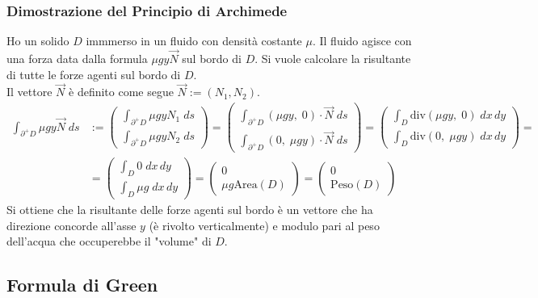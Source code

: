 \documentclass[a4paper]{article}
\newcommand\diver{\text{div}} %
\begin{document}
\subsubsection*{Dimostrazione del Principio di Archimede}
Ho un solido \(D\) immmerso in un fluido con densità costante \(\mu\). Il fluido agisce con una forza data dalla formula
\(\mu g y \vec{N}\) sul bordo di \(D\). Si vuole calcolare la risultante di tutte le forze agenti sul bordo di \(D\). \\
Il vettore \(\vec{N}\) è definito come segue \(\vec{N} := (N_1, N_2)\).
\begin{align*}
	\int_{\partial^+D} \mu g y \vec{N} \; ds &:= \left(\begin{matrix}
		\displaystyle \int_{\partial^+D} \mu g y N_1 \; ds \\[10pt]
		\displaystyle \int_{\partial^+D} \mu g y N_2 \; ds
	\end{matrix}\right) = \left(\begin{matrix}
		\displaystyle \int_{\partial^+D} (\mu g y, \; 0) \cdot \vec{N} \; ds \\[10pt]
		\displaystyle \int_{\partial^+D} (0, \; \mu g y) \cdot \vec{N} \; ds
	\end{matrix}\right) = \left(\begin{matrix}
		\displaystyle \int_D \diver (\mu g y, \; 0) \; dx \, dy \\[10pt]
		\displaystyle \int_D \diver (0, \; \mu g y) \; dx \, dy
	\end{matrix}\right) = \\
	&= \left(\begin{matrix}
		\displaystyle \int_D 0 \; dx \, dy \\[10pt]
		\displaystyle \int_D \mu g \; dx \, dy
	\end{matrix}\right) = \left(\begin{matrix}
		0 \\[10pt]
		\mu g \text{Area}(D)
	\end{matrix}\right) = \left(\begin{matrix}
		0 \\[10pt]
		\text{Peso}(D)
	\end{matrix}\right)
\end{align*}
Si ottiene che la risultante delle forze agenti sul bordo è un vettore che ha direzione concorde all'asse \(y\) (è rivolto
verticalmente) e modulo pari al peso dell'acqua che occuperebbe il "volume" di \(D\).

\subsection{Formula di Green}
\end{document}
